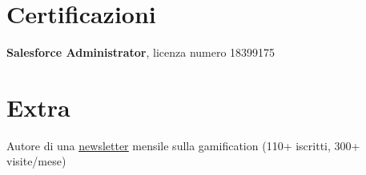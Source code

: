 \documentclass[11pt]{article}
\newcommand{\bodySize}{\small}
\newcommand{\resumeItem}[1]{\item \bodySize #1}
\begin{document}
\section{Certificazioni}
\begin{resumeList}
  \resumeItem{\textbf{Salesforce Administrator}, licenza numero 18399175}
\end{resumeList}

\section{Extra}
\begin{resumeList}
  \resumeItem{Autore di una \href{https://giacomification.substack.com/}{\underline{newsletter}} mensile sulla gamification (110+ iscritti, 300+ visite/mese)}
\end{resumeList}

\end{document}
